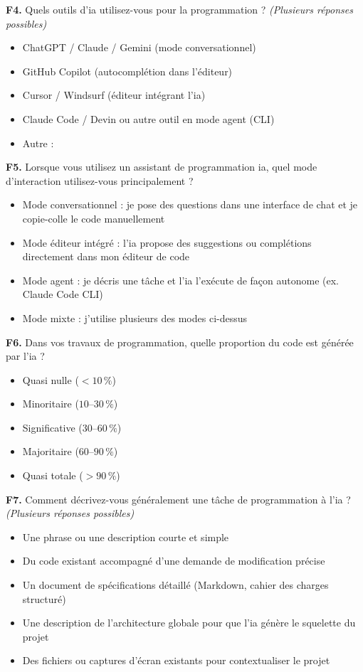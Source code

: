 \textbf{F4.} Quels outils d'\gls{ia} utilisez-vous pour la programmation ?
\textit{(Plusieurs réponses possibles)}
\begin{itemize}[label=$\square$, leftmargin=1.5cm]
  \item ChatGPT / Claude / Gemini (mode conversationnel)
  \item GitHub Copilot (autocomplétion dans l'éditeur)
  \item Cursor / Windsurf (éditeur intégrant l'\gls{ia})
  \item Claude Code / Devin ou autre outil en mode agent (CLI)
  \item Autre : \underline{\hspace{4cm}}
\end{itemize}
 
\textbf{F5.} Lorsque vous utilisez un assistant de programmation \gls{ia},
quel mode d'interaction utilisez-vous principalement ?
\begin{itemize}[label=$\square$, leftmargin=1.5cm]
  \item Mode conversationnel : je pose des questions dans une interface de
        chat et je copie-colle le code manuellement
  \item Mode éditeur intégré : l'\gls{ia} propose des suggestions ou
        complétions directement dans mon éditeur de code
  \item Mode agent : je décris une tâche et l'\gls{ia} l'exécute de façon
        autonome (ex. Claude Code CLI)
  \item Mode mixte : j'utilise plusieurs des modes ci-dessus
\end{itemize}
 
\textbf{F6.} Dans vos travaux de programmation, quelle proportion du code
est générée par l'\gls{ia} ?
\begin{itemize}[label=$\square$, leftmargin=1.5cm]
  \item Quasi nulle ($< 10\,\%$)
  \item Minoritaire ($10$--$30\,\%$)
  \item Significative ($30$--$60\,\%$)
  \item Majoritaire ($60$--$90\,\%$)
  \item Quasi totale ($> 90\,\%$)
\end{itemize}
 
\textbf{F7.} Comment décrivez-vous généralement une tâche de programmation
à l'\gls{ia} ? \textit{(Plusieurs réponses possibles)}
\begin{itemize}[label=$\square$, leftmargin=1.5cm]
  \item Une phrase ou une description courte et simple
  \item Du code existant accompagné d'une demande de modification précise
  \item Un document de spécifications détaillé (Markdown, cahier des
        charges structuré)
  \item Une description de l'architecture globale pour que l'\gls{ia}
        génère le squelette du projet
  \item Des fichiers ou captures d'écran existants pour contextualiser le
        projet
\end{itemize}
 
